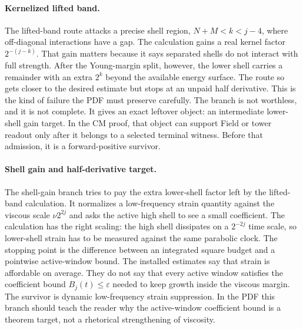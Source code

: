 \paragraph{Kernelized lifted band.}
The lifted-band route attacks a precise shell region, \(N+M<k<j-4\), where
off-diagonal interactions have a gap.
The calculation gains a real kernel factor \(2^{-(j-k)}\).
That gain matters because it says separated shells do not interact with full
strength.
After the Young-margin split, however, the lower shell carries a remainder with an
extra \(2^k\) beyond the available energy surface.
The route so gets closer to the desired estimate but stops at an unpaid
half derivative.
This is the kind of failure the PDF must preserve carefully.
The branch is not worthless, and it is not complete.
It gives an exact leftover object: an intermediate lower-shell gain target.
In the CM proof, that object can support Field or tower readout only after it
belongs to a selected terminal witness.
Before that admission, it is a forward-positive survivor.

\paragraph{Shell gain and half-derivative target.}
The shell-gain branch tries to pay the extra lower-shell factor left by the
lifted-band calculation.
It normalizes a low-frequency strain quantity against the viscous scale
\(\nu2^{2j}\) and asks the active high shell to see a small coefficient.
The calculation has the right scaling: the high shell dissipates on a
\(2^{-2j}\) time scale, so lower-shell strain has to be measured against the
same parabolic clock.
The stopping point is the difference between an integrated square budget and a
pointwise active-window bound.
The installed estimates say that strain is affordable on average.
They do not say that every active window satisfies the coefficient bound
\(B_j(t)\le\varepsilon\) needed to keep growth inside the viscous margin.
The survivor is dynamic low-frequency strain suppression.
In the PDF this branch should teach the reader why the active-window coefficient
bound is a theorem target, not a rhetorical strengthening of viscosity.


